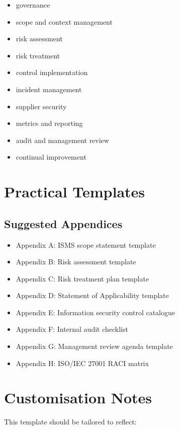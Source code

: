 \documentclass[
  letterpaper,
  DIV=11,
  numbers=noendperiod]{scrartcl}
\providecommand{\tightlist}{%
  \setlength{\itemsep}{0pt}\setlength{\parskip}{0pt}}
\begin{document}
\begin{itemize}
\tightlist
\item
  governance
\item
  scope and context management
\item
  risk assessment
\item
  risk treatment
\item
  control implementation
\item
  incident management
\item
  supplier security
\item
  metrics and reporting
\item
  audit and management review
\item
  continual improvement
\end{itemize}

\section{Practical Templates}\label{practical-templates}

\subsection{Suggested Appendices}\label{suggested-appendices}

\begin{itemize}
\tightlist
\item
  Appendix A: ISMS scope statement template
\item
  Appendix B: Risk assessment template
\item
  Appendix C: Risk treatment plan template
\item
  Appendix D: Statement of Applicability template
\item
  Appendix E: Information security control catalogue
\item
  Appendix F: Internal audit checklist
\item
  Appendix G: Management review agenda template
\item
  Appendix H: ISO/IEC 27001 RACI matrix
\end{itemize}

\section{Customisation Notes}\label{customisation-notes}

This template should be tailored to reflect:
\end{document}
